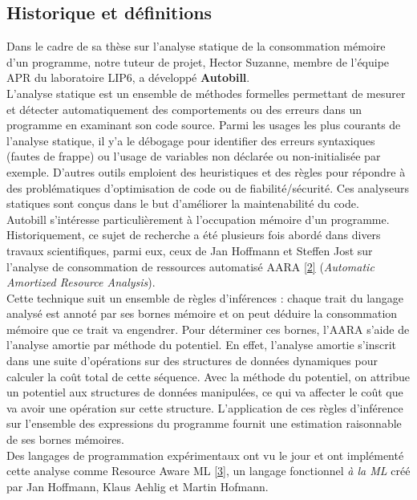\documentclass[12pt]{article}
\begin{document}
\subsection{Historique et définitions}\label{historique-et-duxe9finitions}

Dans le cadre de sa thèse sur l'analyse statique de la consommation
mémoire d'un programme, notre tuteur de projet, Hector Suzanne, membre de l'équipe APR du laboratoire LIP6, a développé \textbf{Autobill}. \\

L'analyse statique est un ensemble de méthodes formelles permettant de
mesurer et détecter automatiquement des comportements ou des erreurs dans un
programme en examinant son code source. Parmi les usages les plus courants 
de l'analyse statique, il y'a le débogage pour identifier des erreurs 
syntaxiques (fautes de frappe) ou l'usage de variables non déclarée ou 
non-initialisée par exemple. D'autres outils emploient des heuristiques et des règles pour répondre à des problématiques d'optimisation de code ou de fiabilité/sécurité. Ces analyseurs statiques sont conçus dans le but d'améliorer la maintenabilité du code. \\ 

Autobill s'intéresse particulièrement à l'occupation mémoire d'un programme. Historiquement, 
ce sujet de recherche a été plusieurs fois abordé dans divers travaux scientifiques, parmi eux, ceux de Jan Hoffmann et Steffen Jost sur l'analyse de consommation de ressources automatisé AARA
\protect\hyperlink{ref-Hoffmann}{{[}2{]}} (\emph{Automatic Amortized
Resource Analysis}).\\ 

Cette technique suit un ensemble de règles d'inférences : chaque trait du langage analysé est annoté par ses bornes mémoire et on peut déduire la consommation mémoire que ce trait va engendrer. Pour déterminer ces bornes, l'AARA s'aide de l'analyse amortie par méthode du potentiel. En effet, l'analyse amortie s'inscrit dans une suite d'opérations sur des structures de données dynamiques pour calculer la coût total de cette séquence. Avec la méthode du potentiel, on attribue un potentiel aux structures de données manipulées, ce qui va affecter le coût que va avoir une opération sur cette structure. L’application de ces règles d'inférence sur l'ensemble des expressions du programme fournit une estimation raisonnable de ses bornes mémoires.\\

Des langages de programmation expérimentaux ont vu le jour et ont implémenté cette analyse comme Resource Aware ML \protect\hyperlink{ref-RAML}{{[}3{]}}, un langage fonctionnel \emph{à la ML} créé par Jan Hoffmann, Klaus Aehlig et Martin Hofmann.
\end{document}
